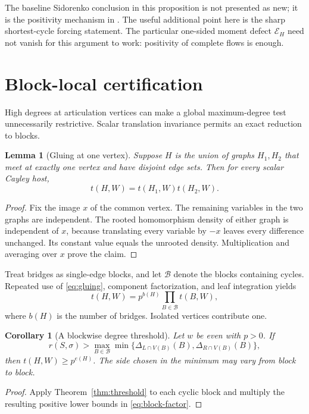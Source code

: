 \documentclass[11pt]{article}
\numberwithin{equation}{section}
\newtheorem{lemma}[theorem]{Lemma}
\newtheorem{corollary}[theorem]{Corollary}
\theoremstyle{definition}
\theoremstyle{remark}
\newcommand{\Err}{\mathcal E}
\begin{document}
The baseline Sidorenko conclusion in this proposition is not presented
as new; it is the positivity mechanism in \cite{YuqiZhao}. The useful
additional point here is the sharp shortest-cycle forcing statement.
The particular one-sided moment defect $\Err_H$ need not vanish for
this argument to work: positivity of complete flows is enough.

\section{Block-local certification}
\label{sec:blocks}

High degrees at articulation vertices can make a global maximum-degree
test unnecessarily restrictive. Scalar translation invariance permits
an exact reduction to blocks.

\begin{lemma}[Gluing at one vertex]
\label{lem:glue}
Suppose $H$ is the union of graphs $H_1,H_2$ that meet at exactly one
vertex and have disjoint edge sets. Then for every scalar Cayley host,
\begin{equation}
 t(H,W)=t(H_1,W)t(H_2,W).
 \label{eq:gluing}
\end{equation}
\end{lemma}
\begin{proof}
Fix the image $x$ of the common vertex. The remaining variables in the
two graphs are independent. The rooted homomorphism density of either
graph is independent of $x$, because translating every variable by
$-x$ leaves every difference unchanged. Its constant value equals the
unrooted density. Multiplication and averaging over $x$ prove the claim.
\end{proof}

Treat bridges as single-edge blocks, and let $\mathcal B$ denote the
blocks containing cycles. Repeated use of \eqref{eq:gluing}, component
factorization, and leaf integration yields
\begin{equation}
 t(H,W)=p^{b(H)}\prod_{B\in\mathcal B}t(B,W),
 \label{eq:block-factor}
\end{equation}
where $b(H)$ is the number of bridges. Isolated vertices contribute one.

\begin{corollary}[A blockwise degree threshold]
\label{cor:block-degree}
Let $w$ be even with $p>0$. If
\begin{equation}
 r(S,\sigma)>
 \max_{B\in\mathcal B}
       \min\{\Delta_{L\cap V(B)}(B),
              \Delta_{R\cap V(B)}(B)\},
 \label{eq:block-degree}
\end{equation}
then $t(H,W)\geq p^{e(H)}$. The side chosen in the minimum may vary
from block to block.
\end{corollary}
\begin{proof}
Apply Theorem~\ref{thm:threshold} to each cyclic block and multiply the
resulting positive lower bounds in \eqref{eq:block-factor}.
\end{proof}
\end{document}
